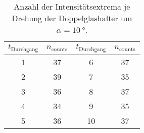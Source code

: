 \begin{table}
  \centering
  \caption{Anzahl der Intensitätsextrema je Drehung der Doppelglashalter um $\alpha = \SI{10}{\degree}$.}
  \label{tabular_02}
  \begin{tabular}{c c | c c}
    \toprule
   \multicolumn{1}{c}{$t_\text{Durchgang}$} & \multicolumn{1}{c}{$n_\text{counts}$} & \multicolumn{1}{c}{$t_\text{Durchgang}$} & \multicolumn{1}{c}{$n_\text{counts}$}\\
   \midrule
    \num{1} & \num{37} & \num{6 } & \num{37} \\
    \num{2} & \num{39} & \num{7 } & \num{35} \\
    \num{3} & \num{36} & \num{8 } & \num{37} \\
    \num{4} & \num{34} & \num{9 } & \num{35} \\
    \num{5} & \num{36} & \num{10} & \num{37} \\
\bottomrule
  \end{tabular}
\end{table}
